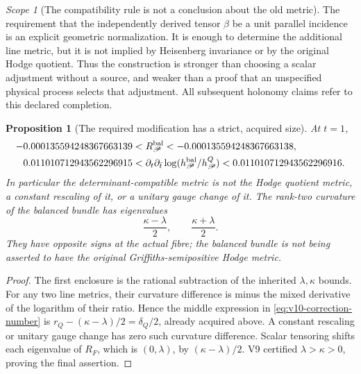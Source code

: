 \documentclass[11pt]{article}
\newtheorem{proposition}[proposition]{Proposition}
\theoremstyle{definition}
\theoremstyle{remark}
\newtheorem{scope}[scope]{Scope}
\begin{document}
\begin{scope}[The compatibility rule is not a conclusion about the old metric]
The requirement that the independently derived tensor $\beta$ be a unit
parallel incidence is an explicit geometric normalization. It is enough to
determine the additional line metric, but it is not implied by Heisenberg
invariance or by the original Hodge quotient. Thus the construction is
stronger than choosing a scalar adjustment without a source, and weaker
than a proof that an unspecified physical process selects that adjustment.
All subsequent holonomy claims refer to this declared completion.
\end{scope}

\begin{proposition}[The required modification has a strict, acquired size]
\label{prop:v10-correction-size}
At $t=1$,
\begin{align}
 -0.000135594248367663139
 &<R_{\mathscr P}^{\rm bal}
 <-0.000135594248367663138,\label{eq:v10-bal-number}\\
 0.011010712943562296915
 &<\partial_t\partial_{\bar t}
       \log(h_{\mathscr P}^{\rm bal}/h_{\mathscr P}^{Q})
 <0.011010712943562296916.\label{eq:v10-correction-number}
\end{align}
In particular the determinant-compatible metric is not the Hodge quotient
metric, a constant rescaling of it, or a unitary gauge change of it.
The rank-two curvature of the balanced bundle has eigenvalues
\begin{equation}
 \boxed{\frac{\kappa-\lambda}{2},\qquad
        \frac{\kappa+\lambda}{2}.}
 \label{eq:v10-balanced-spectrum}
\end{equation}
They have opposite signs at the actual fibre; the balanced bundle is not
being asserted to have the original Griffiths-semipositive Hodge metric.
\end{proposition}
\begin{proof}
The first enclosure is the rational subtraction of the inherited
$\lambda,\kappa$ bounds. For any two line metrics, their curvature
difference is minus the mixed derivative of the logarithm of their ratio.
Hence the middle expression in \cref{eq:v10-correction-number} is
$r_Q-(\kappa-\lambda)/2=\delta_Q/2$, already acquired above.
A constant rescaling or unitary gauge change has zero such curvature
difference. Scalar tensoring shifts each eigenvalue of $R_F$, which is
$(0,\lambda)$, by $(\kappa-\lambda)/2$. V9 certified
$\lambda>\kappa>0$, proving the final assertion.
\end{proof}
\end{document}
